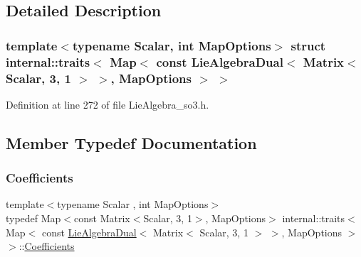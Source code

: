 \subsection{Detailed Description}
\subsubsection*{template$<$typename Scalar, int Map\+Options$>$\newline
struct internal\+::traits$<$ Map$<$ const Lie\+Algebra\+Dual$<$ Matrix$<$ Scalar, 3, 1 $>$ $>$, Map\+Options $>$ $>$}



Definition at line 272 of file Lie\+Algebra\+\_\+so3.\+h.



\subsection{Member Typedef Documentation}
\hypertarget{structinternal_1_1traits_3_01_map_3_01const_01_lie_algebra_dual_3_01_matrix_3_01_scalar_00_013_0e77a233aa7e2f28dddf71e39df1dd866_a925f17123c9a6154ed57fa5c397780cd}{}\label{structinternal_1_1traits_3_01_map_3_01const_01_lie_algebra_dual_3_01_matrix_3_01_scalar_00_013_0e77a233aa7e2f28dddf71e39df1dd866_a925f17123c9a6154ed57fa5c397780cd} 
\subsubsection{\texorpdfstring{Coefficients}{Coefficients}}
{\footnotesize\ttfamily template$<$typename Scalar , int Map\+Options$>$ \\
typedef Map$<$const Matrix$<$Scalar, 3, 1$>$, Map\+Options$>$ internal\+::traits$<$ Map$<$ const \hyperlink{class_lie_algebra_dual}{Lie\+Algebra\+Dual}$<$ Matrix$<$ Scalar, 3, 1 $>$ $>$, Map\+Options $>$ $>$\+::\hyperlink{structinternal_1_1traits_3_01_map_3_01const_01_lie_algebra_dual_3_01_matrix_3_01_scalar_00_013_0e77a233aa7e2f28dddf71e39df1dd866_a925f17123c9a6154ed57fa5c397780cd}{Coefficients}}



